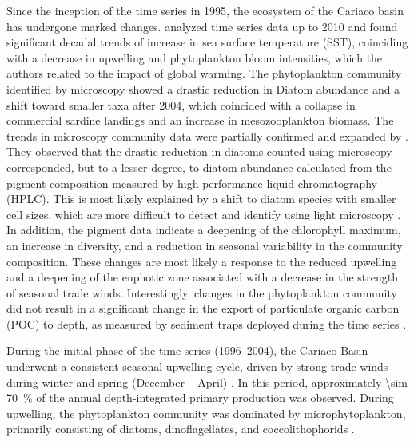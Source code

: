     Since the inception of the time series in 1995, the ecosystem of the Cariaco basin has undergone marked changes.  analyzed time series data up to 2010 and found significant decadal trends of increase in sea surface temperature (SST), coinciding with a decrease in upwelling and phytoplankton bloom intensities, which the authors related to the impact of global warming. The phytoplankton community identified by microscopy showed a drastic reduction in Diatom abundance and a shift toward smaller taxa after 2004, which coincided with a collapse in commercial sardine landings and an increase in mesozooplankton biomass.
    The trends in microscopy community data were partially confirmed and expanded by . They observed that the drastic reduction in diatoms counted using microscopy corresponded, but to a lesser degree, to diatom abundance calculated from the pigment composition measured by high-performance liquid chromatography (HPLC). This is most likely explained by a shift to diatom species with smaller cell sizes, which are more difficult to detect and identify using light microscopy \cite{lorenzoni_characterization_2015}. In addition, the pigment data indicate a deepening of the chlorophyll maximum, an increase in diversity, and a reduction in seasonal variability in the community composition. These changes are most likely a response to the reduced upwelling and a deepening of the euphotic zone associated with a decrease in the strength of seasonal trade winds. Interestingly, changes in the phytoplankton community did not result in a significant change in the export of particulate organic carbon (POC) to depth, as measured by sediment traps deployed during the time series \cite{pinckney_phytoplankton_2015}.


    During the initial phase of the time series (1996–2004), the Cariaco Basin underwent a consistent seasonal upwelling cycle, driven by strong trade winds during winter and spring (December – April) \cite{mullerkarger_annual_2001, astor_seasonal_2003}. In this period, approximately \qty{\sim 70}{\%} of the annual depth-integrated primary production was observed. During upwelling, the phytoplankton community was dominated by microphytoplankton, primarily consisting of diatoms, dinoflagellates, and coccolithophorids \cite{pinckney_phytoplankton_2015}.

